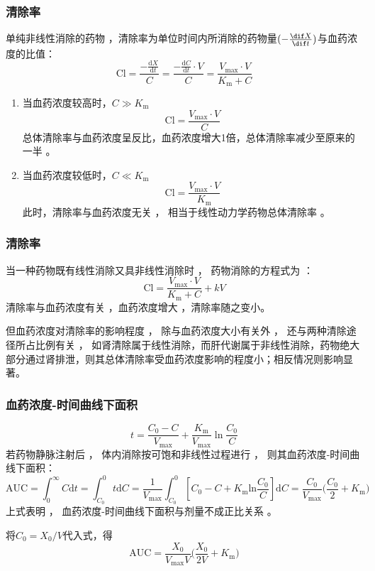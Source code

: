 \documentclass[dvipsnames, svgnames, x11names]{beamer}
\begin{document}
\begin{frame}
    \frametitle{清除率}
    单纯非线性消除的药物 ，清除率为单位时间内所消除的药物量$(-\frac{\dif X}{\dif t})$与血药浓度的比值：
    \[
            \mathrm{Cl}=\frac{-\frac{\mathrm{d}X}{\mathrm{d}t}}C=\frac{-\frac{\mathrm{d}C}{\mathrm{d}t}\cdot V}{C}=\frac{V_{\mathrm{max}}\cdot V}{K_{\mathrm{m}}+C}
    \]
    \begin{enumerate}
      \item 当血药浓度较高时，$C\gg K_{\mathrm{m}}$
      \[
        \mathrm{Cl}=\frac{V_{\mathrm{max}}\cdot V}{C}
      \]
      总体清除率与血药浓度呈反比，血药浓度增大1倍，总体清除率减少至原来的一半 。
      \item 当血药浓度较低时，$C\ll K_{\mathrm{m}}$
      \[
        \mathrm{Cl}=\frac{V_{\mathrm{max}}\cdot V}{K_{\mathrm{m}}}
      \]
      此时，清除率与血药浓度无关 ， 相当于线性动力学药物总体清除率 。
    \end{enumerate}
\end{frame}


\begin{frame}
    \frametitle{清除率}
    当一种药物既有线性消除又具非线性消除时 ， 药物消除的方程式为 ：
    \[
        \mathrm{Cl}=\frac{V_{\mathrm{max}}\cdot V}{K_{\mathrm{m}}+C} +kV
    \]
    清除率与血药浓度有关 ，血药浓度增大 ，清除率随之变小。 
    
    但血药浓度对清除率的影响程度 ， 除与血药浓度大小有关外 ， 还与两种清除途径所占比例有关 ， 如肾清除属于线性消除，而肝代谢属于非线性消除，药物绝大部分通过肾排泄，则其总体清除率受血药浓度影响的程度小；相反情况则影响显著。
\end{frame}


\begin{frame}
    \frametitle{血药浓度-时间曲线下面积}
    \[
        t=\frac{C_0-C}{V_{\mathrm{max}}}+\frac{K_{\mathrm{m}}}{V_{\mathrm{max}}}{\ln\frac{C_0}C}
    \]
    若药物静脉注射后 ， 体内消除按可饱和非线性过程进行 ， 则其血药浓度-时间曲线下面积：
    \[
        \mathrm{AUC}=\int_{0}^{\infty}C\mathrm{d}t=\int_{C_0}^{0}t\mathrm{d}C=\frac{1}{V_{\mathrm{max}}}\int_{C_{0}}^{0}\left[C_{0}-C+K_{\mathrm{m}}\mathrm{ln}\frac{C_{0}}{C}\right]\mathrm{d}C=\frac{C_{0}}{V_{\mathrm{max}}}\biggl(\frac{C_{0}}{2}+K_{\mathrm{m}}\biggr)
    \]
    上式表明 ， 血药浓度-时间曲线下面积与剂量不成正比关系 。

    将$C_0=X_0/V$代入式，得
    \[
        \mathrm{AUC}=\frac{X_{0}}{V_{\mathrm{max}}V}\biggl(\frac{X_{0}}{2V}+K_{\mathrm{m}}\biggr)
    \]
\end{frame}
\end{document}
